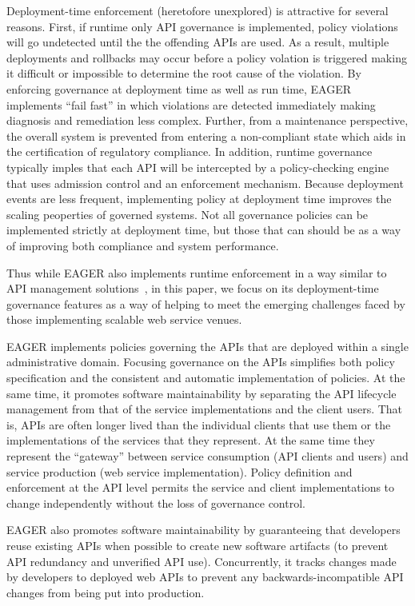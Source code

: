 Deployment-time enforcement (heretofore unexplored) is attractive for several
reasons.  First, if runtime only API governance is implemented, 
policy violations will go undetected until the the offending APIs are used.  
As a result, multiple deployments and rollbacks may occur before a policy
volation is triggered making it difficult or impossible to determine the root
cause of the violation.  By enforcing governance at deployment time as well as
run time, EAGER implements ``fail fast'' in which violations are detected
immediately making diagnosis and remediation less complex.  
Further, from a maintenance perspective,  the overall
system is prevented from entering a non-compliant state which aids in the
certification of regulatory compliance.  In addition, runtime governance
typically imples that each API will be intercepted by a policy-checking engine
that uses admission control and an enforcement mechanism.  Because deployment
events are less frequent, implementing policy at deployment time improves the
scaling peoperties of governed systems.   Not all governance policies can be
implemented strictly at deployment time, but those that can should be as a way
of improving both compliance and system performance.

Thus while
EAGER also implements runtime
enforcement in a way similar to API management
solutions~\cite{wso2am,apigee,layer7,3scale}, in this paper, we focus
on its deployment-time governance features as a way of helping to meet the
emerging challenges faced by those
implementing scalable web service venues. 

EAGER implements policies governing the APIs that are 
deployed within a single administrative domain.  Focusing governance on
the APIs simplifies both policy specification and the consistent
and automatic implementation of policies.  At the same time, it promotes
software maintainability by separating the API lifecycle management from that
of the service implementations and the client users.  That is, APIs are often
longer lived than the individual clients that use them or the implementations
of the services that they represent.  At the same time they represent the
``gateway'' between service consumption (API clients and users) and service
production (web service implementation).  Policy definition and enforcement at
the API level permits the service and client implementations to change
independently without the loss of governance control.

EAGER also promotes software maintainability by guaranteeing that 
developers reuse existing APIs when possible to create new software artifacts
(to prevent API redundancy and unverified API use). Concurrently, it
tracks changes made by developers to deployed web APIs to prevent
any backwards-incompatible API changes from being put into production.

